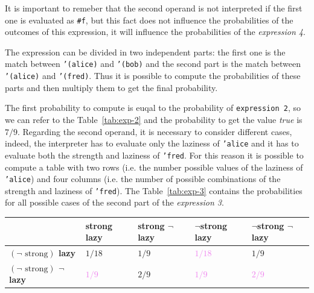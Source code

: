 \begin{itemize}
        It is important to remeber that the second operand is not interpreted if the first one is evaluated as \texttt{\#f}, but this
        fact does not influence the probabilities of the outcomes of this expression, it will influence the probabilities of the
        \textit{expression 4}.

        The expression can be divided in two independent parts: the first one is the match between \texttt{'(alice)} and 
        \texttt{'(bob)} and the second part is the match between \texttt{'(alice)} and \texttt{'(fred)}. Thus it is possible
        to compute the probabilities of these parts and then multiply them to get the final probability.
        
        The first probability to compute is euqal to the probability of \texttt{expression 2}, so we can refer to the 
        Table~\ref{tab:exp-2} and the probability to get the value \textit{true} is $7/9$.
        Regarding the second operand, it is necessary to consider different cases, indeed, the interpreter has to evaluate only the
        laziness of \texttt{'alice} and it has to evaluate both the strength and laziness of \texttt{'fred}. For this reason it is
        possible to compute a table with two rows (i.e. the number possible values of the laziness of \texttt{'alice}) and four columns
        (i.e. the number of possible combinations of the strength and laziness of \texttt{'fred}).
        The Table~\ref{tab:exp-3} contains the probabilities for all possible cases of the second part of the \textit{expression 3}.

        \begin{table}[H]
            \centering
            \bgroup
                \def\arraystretch{1.5}
                \begin{tabular}{| l | C{1.8cm} C{1.8cm} C{1.8cm} C{1.8cm}  |}                    
                    \hline
                     & 
                        \textbf{strong lazy} & \textbf{strong $\neg$lazy} & \textbf{$\neg$strong lazy} & \textbf{$\neg$strong $\neg$lazy} \\
                    \hline

                    \textbf{$\left(\neg\text{ strong}\right)$ lazy} & \textcolor{RedOrange}{$1/18$} & \textcolor{RedOrange}{$1/9$} & 
                        \textcolor{Violet}{$1/18$} & \textcolor{RedOrange}{$1/9$} \\ 

                    \textbf{$\left(\neg\text{ strong}\right)$ $\neg$lazy} & \textcolor{Violet}{$1/9$} & \textcolor{RedOrange}{$2/9$} & 
                        \textcolor{Violet}{$1/9$} & \textcolor{Violet}{$2/9$} \\


\end{tabular}
\end{table}
\end{itemize}
